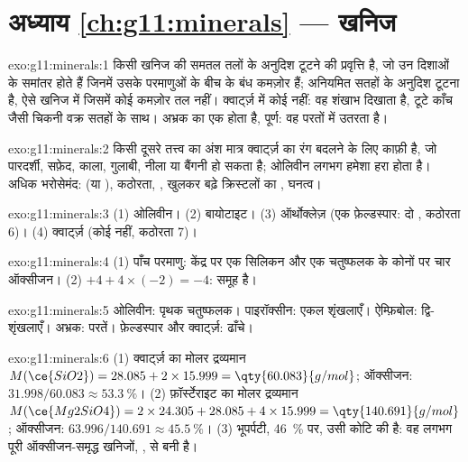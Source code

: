 \section*{अध्याय \ref{ch:g11:minerals} --- खनिज}

\begin{solution}{exo:g11:minerals:1}
 किसी खनिज की समतल तलों के अनुदिश टूटने की प्रवृत्ति है, जो उन
दिशाओं के समांतर होते हैं जिनमें उसके परमाणुओं के बीच के बंध कमज़ोर हैं; 
अनियमित सतहों के अनुदिश टूटना है, ऐसे खनिज में जिसमें कोई कमज़ोर तल नहीं।
क्वार्ट्ज़ में कोई  नहीं: वह शंखाभ  दिखाता है, टूटे काँच जैसी चिकनी
वक्र सतहों के साथ। अभ्रक का एक  होता है, पूर्ण: वह परतों में
उतरता है।
\end{solution}

\begin{solution}{exo:g11:minerals:2}
किसी दूसरे तत्त्व का अंश मात्र क्वार्ट्ज़ का रंग बदलने के लिए काफ़ी है, जो
पारदर्शी, सफ़ेद, काला, गुलाबी, नीला या बैंगनी हो सकता है; ओलिवीन लगभग हमेशा
हरा होता है। अधिक भरोसेमंद:  (या ), कठोरता, ,
खुलकर बढ़े क्रिस्टलों का , घनत्व।
\end{solution}

\begin{solution}{exo:g11:minerals:3}
(1) ओलिवीन। (2) बायोटाइट। (3) ऑर्थोक्लेज़ (एक फ़ेल्डस्पार: दो , कठोरता
6)। (4) क्वार्ट्ज़ (कोई  नहीं, कठोरता 7)।
\end{solution}

\begin{solution}{exo:g11:minerals:4}
(1) पाँच परमाणु: केंद्र पर एक सिलिकन और एक चतुष्फलक के कोनों पर चार ऑक्सीजन।
(2) $+4 + 4 \times (-2) = -4$: समूह  है।
\end{solution}

\begin{solution}{exo:g11:minerals:5}
ओलिवीन: पृथक चतुष्फलक। पाइरॉक्सीन: एकल शृंखलाएँ। ऐम्फ़िबोल: द्वि-शृंखलाएँ।
अभ्रक: परतें। फ़ेल्डस्पार और क्वार्ट्ज़: ढाँचे।
\end{solution}

\begin{solution}{exo:g11:minerals:6}
(1) क्वार्ट्ज़ का मोलर द्रव्यमान $M(\ce{SiO2}) = 28.085 + 2 \times 15.999 = \qty{60.083}{g/mol}$;
ऑक्सीजन: $31.998/60.083 \approx \qty{53.3}{\percent}$।
(2) फ़ॉर्स्टेराइट का मोलर द्रव्यमान $M(\ce{Mg2SiO4}) = 2 \times 24.305 + 28.085 + 4 \times 15.999 =
\qty{140.691}{g/mol}$; ऑक्सीजन: $63.996/140.691 \approx \qty{45.5}{\percent}$।
(3) भूपर्पटी, \qty{46}{\percent} पर, उसी कोटि की है: वह लगभग पूरी
ऑक्सीजन-समृद्ध खनिजों, , से बनी है।
\end{solution}

